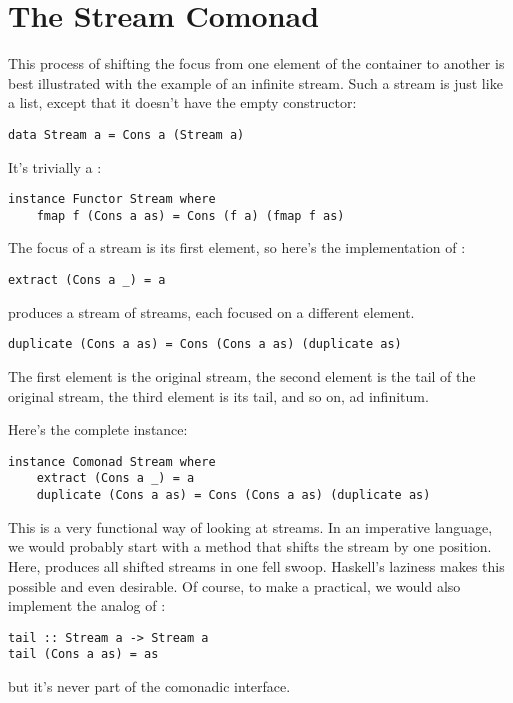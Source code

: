 \section{The Stream Comonad}

This process of shifting the focus from one element of the container to
another is best illustrated with the example of an infinite stream. Such
a stream is just like a list, except that it doesn't have the empty
constructor:

\begin{Verbatim}
data Stream a = Cons a (Stream a)
\end{Verbatim}
It's trivially a :

\begin{Verbatim}
instance Functor Stream where
    fmap f (Cons a as) = Cons (f a) (fmap f as)
\end{Verbatim}
The focus of a stream is its first element, so here's the implementation
of :

\begin{Verbatim}
extract (Cons a _) = a
\end{Verbatim}
 produces a stream of streams, each focused on a
different element.

\begin{Verbatim}
duplicate (Cons a as) = Cons (Cons a as) (duplicate as)
\end{Verbatim}
The first element is the original stream, the second element is the tail
of the original stream, the third element is its tail, and so on, ad
infinitum.

Here's the complete instance:

\begin{Verbatim}
instance Comonad Stream where
    extract (Cons a _) = a 
    duplicate (Cons a as) = Cons (Cons a as) (duplicate as)
\end{Verbatim}
This is a very functional way of looking at streams. In an imperative
language, we would probably start with a method  that
shifts the stream by one position. Here,  produces all
shifted streams in one fell swoop. Haskell's laziness makes this
possible and even desirable. Of course, to make a 
practical, we would also implement the analog of :

\begin{Verbatim}
tail :: Stream a -> Stream a
tail (Cons a as) = as
\end{Verbatim}
but it's never part of the comonadic interface.

